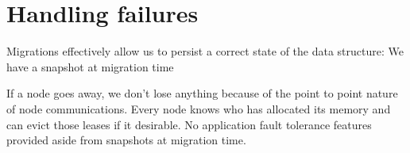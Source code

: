 \section{Handling failures}
Migrations effectively allow us to persist a correct state of the data structure: We have a snapshot at migration time

If a node goes away, we don't lose anything because of the point to point
nature of node communications. Every node knows who has allocated its memory
and can evict those leases if it desirable. No application fault tolerance
features provided aside from snapshots at migration time.
